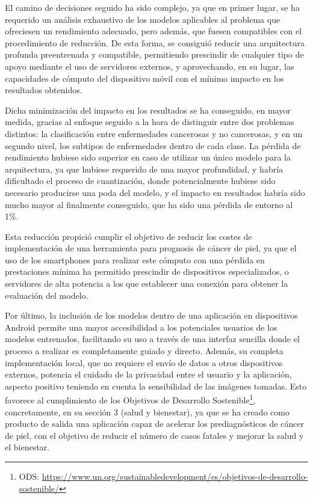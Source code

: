  El camino de decisiones seguido ha sido complejo, ya que en primer lugar, se ha requerido un análisis exhaustivo de los modelos aplicables al problema que ofreciesen un rendimiento adecuado, pero además, que fuesen compatibles con el procedimiento de reducción. De esta forma, se consiguió reducir una arquitectura profunda preentrenada y compatible, permitiendo prescindir de cualquier tipo de apoyo mediante el uso de servidores externos, y aprovechando, en su lugar, las capacidades de cómputo del dispositivo móvil con el mínimo impacto en los resultados obtenidos.

Dicha minimización del impacto en los resultados se ha conseguido, en mayor medida, gracias al enfoque seguido a la hora de distinguir entre dos problemas distintos: la clasificación entre enfermedades cancerosas y no cancerosas, y en un segundo nivel, los subtipos de enfermedades dentro de cada clase. La pérdida de rendimiento hubiese sido superior en caso de utilizar un único modelo para la arquitectura, ya que hubiese requerido de una mayor profundidad, y habría dificultado el proceso de cuantización, donde potencialmente hubiese sido necesario producirse una poda del modelo, y el impacto en resultados habría sido mucho mayor al finalmente conseguido, que ha sido una pérdida de entorno al 1\%. 

Esta reducción propició cumplir el objetivo de reducir los costes de implementación de una herramienta para prognosis de cáncer de piel, ya que el uso de los smartphones para realizar este cómputo con una pérdida en prestaciones mínima ha permitido prescindir de dispositivos especializados, o servidores de alta potencia a los que establecer una conexión para obtener la evaluación del modelo. 

Por último, la inclusión de los modelos dentro de una aplicación en dispositivos Android permite una mayor accesibilidad a los potenciales usuarios de los modelos entrenados, facilitando su uso a través de una interfaz sencilla donde el proceso a realizar es completamente guiado y directo. Además, su completa implementación local, que no requiere el envío de datos a otros dispositivos externos, potencia el cuidado de la privacidad entre el usuario y la aplicación, aspecto positivo teniendo en cuenta la sensibilidad de las imágenes tomadas. Esto favorece al cumplimiento de los Objetivos de Desarrollo Sostenible\footnote{ODS: \url{https://www.un.org/sustainabledevelopment/es/objetivos-de-desarrollo-sostenible/}}, concretamente, en su sección 3 (salud y bienestar), ya que se ha creado como producto de salida una aplicación capaz de acelerar los prediagnósticos de cáncer de piel, con el objetivo de reducir el número de casos fatales y mejorar la salud y el bienestar.

